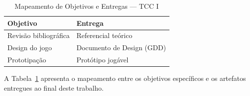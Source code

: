 \begin{table}[htbp]
    \centering
    \caption{Mapeamento de Objetivos e Entregas — TCC I}
    \label{tab:objetivos_entregas}
    \begin{tabular}{@{}p{}p{}@{}}
        \toprule
        \textbf{Objetivo} & \textbf{Entrega} \\
        \midrule
        Revisão bibliográfica & Referencial teórico \\
        Design do jogo        & Documento de Design (GDD) \\
        Prototipação          & Protótipo jogável \\
        \bottomrule
    \end{tabular}
\end{table}

A Tabela~\ref{tab:objetivos_entregas} apresenta o mapeamento entre os objetivos
específicos e os artefatos entregues ao final deste trabalho.

